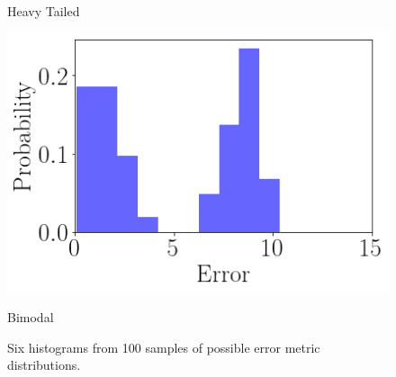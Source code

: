 \begin{figure}[ht]
\begin{minipage}[b]{0.5\linewidth}
    \caption{Heavy Tailed}
    \vspace{4ex}
    \label{heavy_tailed_distributions_hist}
  \end{minipage}%
  \begin{minipage}[b]{0.5\linewidth}
    \centering
    \includegraphics[width=\linewidth]{./img/distributions/twin_peaks_hist.png}
    \caption{Bimodal}
    \label{bimodal_distribution_hist}
    \vspace{4ex}
  \end{minipage}
  \caption{Six histograms from 100 samples of possible error metric distributions.}
  \label{fig:error_metric_distributions_hist}
\end{figure}


